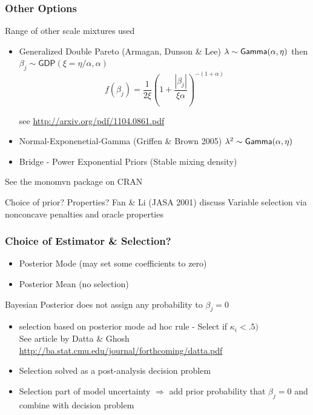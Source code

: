 \documentclass[]{beamer}
\begin{document}
\begin{frame}
  \frametitle{Other Options}
  Range of other scale mixtures used  \pause
  \begin{itemize}
  \item Generalized Double Pareto (Armagan, Dunson \& Lee)  \pause
$\lambda \sim \textsf{Gamma}(\alpha, \eta)$  then $\beta_j \sim \textsf{GDP}(\xi
= \eta/\alpha, \alpha)$  \pause
$$
f(\beta_j) = \frac{1}{2 \xi} (1 + \frac{|\beta_j|}{\xi \alpha})^{-(1 + \alpha)}
$$

see \url{http://arxiv.org/pdf/1104.0861.pdf} \pause
  \item Normal-Exponenetial-Gamma (Griffen \& Brown 2005)
$\lambda^2 \sim \textsf{Gamma}(\alpha, \eta)$
  \pause
  \item Bridge - Power Exponential Priors  (Stable mixing density) \pause

   \end{itemize}
See the monomvn package on CRAN \pause

\vfill

Choice of prior?   Properties?  Fan \& Li (JASA 2001) discuss Variable
selection via nonconcave penalties and oracle properties
\end{frame}

\begin{frame}
  \frametitle{Choice of Estimator \& Selection?}

  \begin{itemize}
  \item Posterior Mode (may set some coefficients to zero) \pause
  \item Posterior Mean (no selection) \pause
  \end{itemize}
  Bayesian Posterior does not assign any probability to $\beta_j = 0$ \pause

  \begin{itemize}
  \item selection based on posterior mode ad hoc rule - Select if
    $\kappa_i < .5)$ \pause \\
See  article by  Datta \& Ghosh
\url{http://ba.stat.cmu.edu/journal/forthcoming/datta.pdf} \pause
  \item Selection solved as a post-analysis decision problem \pause
  \item Selection part of model uncertainty $\Rightarrow$ add prior \pause
    probability that $\beta_j = 0$  and combine with decision problem
  \end{itemize}
\end{frame}
\end{document}
